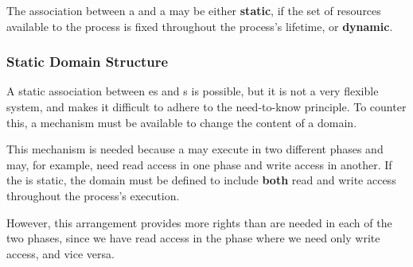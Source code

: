 The association between a  and a  may be either \textbf{static}, if the set of resources available to the process is fixed throughout the process’s lifetime, or \textbf{dynamic}.

\subsubsection{Static Domain Structure}\label{subsubsec:Static_Domain_Structure}
A static association between es and s is possible, but it is not a very flexible system, and makes it difficult to adhere to the need-to-know principle.
To counter this, a mechanism must be available to change the content of a domain.

This mechanism is needed because a  may execute in two different phases and may, for example, need read access in one phase and write access in another.
If the  is static, the domain must be defined to include \textbf{both} read and write access throughout the process's execution.

However, this arrangement provides more rights than are needed in each of the two phases, since we have read access in the phase where we need only write access, and vice versa.

